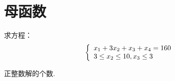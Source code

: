 \documentclass[cn, hazy, blue, normal, 12pt]{elegantnote}
\begin{document}
\section{母函数}

\begin{exercise}

    求方程：
    \begin{equation}
        \notag
        \left\{\begin{array}{l}
            x_{1}+3 x_{2}+x_{3}+x_{4}=160 \\
            3 \leq x_{2} \leq 10, x_{3} \leq 3
        \end{array}\right.
    \end{equation}

    正整数解的个数.

\end{exercise}
\end{document}
